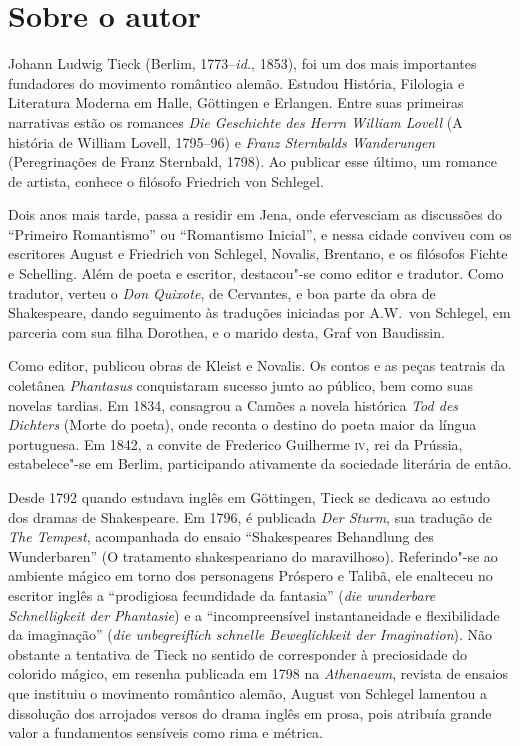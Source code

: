 
\section{Sobre o autor}

\noindent{}Johann Ludwig Tieck (Berlim, 1773--\textit{id.}, 1853), 
foi um dos mais importantes fundadores do movimento romântico alemão. 
Estudou História, Filologia e Literatura Moderna em Halle, 
Göttingen e Erlangen. Entre suas primeiras narrativas estão os romances 
\textit{Die Geschichte des Herrn William Lovell} (A história de William Lovell, 
1795--96) e \textit{Franz Sternbalds Wanderungen} 
(Peregrinações de Franz Sternbald, 1798). 
Ao publicar esse último, um romance de artista, conhece o filósofo 
Friedrich von Schlegel.

Dois anos mais tarde, passa a residir em Jena, 
onde efervesciam as  discussões do ``Primeiro Romantismo'' ou ``Romantismo 
Inicial'', e nessa  cidade conviveu com os escritores August e Friedrich von Schlegel,  Novalis, Brentano, e os filósofos Fichte e Schelling. Além de poeta e escritor, destacou"-se como editor e tradutor. Como tradutor, verteu o \textit{Don Quixote}, de Cervantes, e boa parte da obra de Shakespeare, dando seguimento às traduções iniciadas por A.W.~von Schlegel, 
em parceria com sua filha Dorothea, e o marido desta,
Graf von Baudissin.

Como editor, publicou obras de Kleist e Novalis.
Os contos e as peças teatrais da coletânea \textit{Phantasus} conquistaram 
sucesso junto ao público, bem como suas novelas tardias. Em 1834, consagrou 
a Camões a novela histórica \textit{Tod des Dichters} (Morte do poeta), onde 
reconta o destino do poeta maior da língua portuguesa. Em 1842, a convite 
de Frederico Guilherme \textsc{iv}, rei da Prússia, estabelece"-se em Berlim, 
participando ativamente da sociedade literária de então.


Desde 1792 quando estudava inglês em Göttingen, Tieck se dedicava ao
estudo dos dramas de Shakespeare. Em 1796, é publicada \textit{Der Sturm}, 
sua tradução de \textit{The Tempest}, acompanhada do ensaio
``Shakespeares Behandlung des Wunderbaren'' (O tratamento shakespeariano
do maravilhoso). Referindo"-se ao ambiente mágico em torno dos
personagens Próspero e Talibã, ele enalteceu no escritor inglês a
``prodigiosa fecundidade da fantasia'' (\textit{die wunderbare Schnelligkeit der
Phantasie}) e a ``incompreensível instantaneidade e flexibilidade da
imaginação'' (\textit{die unbegreiflich schnelle Beweglichkeit der Imagination}).
Não obstante a tentativa de Tieck no sentido de corresponder à
preciosidade do colorido mágico, em resenha publicada em 1798 na
\textit{Athenaeum}, revista de ensaios que instituiu o movimento
romântico alemão, August von Schlegel lamentou a dissolução dos
arrojados versos do drama \mbox{inglês} em prosa, pois atribuía grande 
valor a fundamentos sensíveis como rima e métrica.

